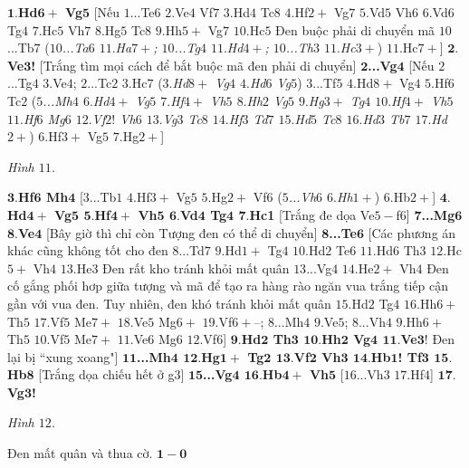 \begin{multicols}{2}
	\vskip 0.1cm
	$\pmb{1.}$\textbf{\color{gocco}Hd$\pmb{6+}$ Vg}$\pmb{5}$ [Nếu $1$...Te$6$ $2.$Ve$4$ Vf$7$ $3.$Hd$4$ Tc$8$ $4.$Hf$2+$ Vg$7$ $5.$Vd$5$ Vh$6$ $6.$Vd$6$ Tg$4$ $7.$Hc$5$ Vh$7$ $8.$Hg$5$ Tc$8$ $9.$Hh$5+$ Vg$7$ $10.$Hc$5$ 
	\vskip 0.1cm
	Đen buộc phải di chuyển mã $10$...Tb$7$ (\textit{$10$...Ta$6$ $11.$Ha$7+$; $10$...Tg$4$ $11.$Hd$4+$; $10$...Th$3$ $11.$Hc$3+$}) $11.$Hc$7+$]
	\vskip 0.1cm
	$\pmb{2.}$\textbf{\color{gocco}Ve$\pmb{3}$!} [Trắng tìm mọi cách để bắt buộc mã đen phải di chuyển]
	\vskip 0.1cm
	$\pmb{2}$\textbf{\color{gocco}...Vg}$\pmb{4}$ [Nếu $2$...Tg$4$ $3.$Ve$4$; $2$...Tc$2$ $3.$Hc$7$ ($3.$\textit{Hd$8+$ Vg$4$ $4.$Hd$6$ Vg$5$}) $3$...Tf$5$ $4.$Hd$8+$ Vg$4$ $5.$Hf$6$ Tc$2$ (\textit{$5$...Mh$4$ $6.$Hd$4+$ Vg$5$ $7.$Hf$4+$ Vh$5$ $8.$Hh$2$ Vg$5$ $9.$Hg$3+$ Tg$4$ $10.$Hf$4+$ Vh$5$ $11.$Hf$6$ Mg$6$ $12.$Vf$2!$ Vh$6$ $13.$Vg$3$ Tc$8$ $14.$Hf$3$ Td$7$ $15.$Hd$5$ Tc$8$ $16.$Hd$3$ Tb$7$ $17.$Hd$2+$}) $6.$Hf$3+$ Vg$5$ $7.$Hg$2+$]
	\begin{center}
		\newgame
		\showboard
		\vskip 0.1cm
		\textit{\small\color{gocco}Hình $11$.}
	\end{center}
	$\pmb{3.}$\textbf{\color{gocco}Hf$\pmb{6}$ Mh}$\pmb{4}$ [$3$...Tb$1$ $4.$Hf$3+$ Vg$5$ $5.$Hg$2+$ Vf$6$ (\textit{$5$...Vh$6$ $6.$Hh$1+$}) $6.$Hb$2+$]
	\vskip 0.1cm
	$\pmb{4.}$\textbf{\color{gocco}Hd$\pmb{4+}$ Vg$\pmb{5}$ $\pmb{5.}$Hf$\pmb{4+}$ Vh$\pmb{5}$ $\pmb{6.}$Vd$\pmb{4}$ Tg$\pmb{4}$ $\pmb{7.}$Hc1} [Trắng đe dọa Ve$5-$f$6$]
	\vskip 0.1cm
	$\pmb{7}$\textbf{\color{gocco}...Mg$\pmb{6}$ $\pmb{8.}$Ve}$\pmb{4}$ [Bây giờ thì chỉ còn Tượng đen có thể di chuyển]
	\vskip 0.1cm
	$\pmb{8}$\textbf{\color{gocco}...Te}$\pmb{6}$ [Các phương án khác cũng không tốt cho đen $8$...Td$7$ $9.$Hd$1+$ Tg$4$ $10.$Hd$2$ Te$6$ $11.$Hd$6$ Th$3$ $12.$Hc$5+$ Vh$4$ $13.$He$3$ Đen rất kho tránh khỏi mất quân $13$...Vg$4$ $14.$He$2+$ Vh$4$ Đen cố gắng phối hơp giữa tượng và mã để tạo ra hàng rào ngăn vua trắng tiếp cận gần với vua đen. Tuy nhiên, đen khó tránh khỏi mất quân $15.$Hd$2$ Tg$4$ $16.$Hh$6+$ Th$5$ $17.$Vf$5$ Me$7+$ $18.$Ve$5$ Mg$6+$ $19.$Vf$6+–$; $8$...Mh$4$ $9.$Ve$5$; $8$...Vh$4$ $9.$Hh$6+$ Th$5$ $10.$Vf$5$ Me$7+$ $11.$Ve$6$ Mg$6$ $12.$Vf$6$]
	\vskip 0.1cm
	$\pmb{9.}$\textbf{\color{gocco}Hd$\pmb{2}$ Th$\pmb{3}$ $\pmb{10.}$Hh$\pmb{2}$ Vg$\pmb{4}$ $\pmb{11.}$Ve$\pmb{3!}$} 
	Đen lại bị ``xung xoang"]
	\vskip 0.1cm
	$\pmb{11}$\textbf{\color{gocco}...Mh$\pmb{4}$ $\pmb{12.}$Hg$\pmb{1+}$ Tg$\pmb{2}$ $\pmb{13.}$Vf$\pmb{2}$ Vh$\pmb{3}$ $\pmb{14.}$Hb$\pmb{1}$! Tf$\pmb{3}$ $\pmb{15.}$Hb}$\pmb{8}$ [Trắng dọa chiếu hết ở g$3$]
	\vskip 0.1cm
	$\pmb{15}$\textbf{\color{gocco}...Vg$\pmb{4}$ $\pmb{16.}$Hb$\pmb{4+}$ Vh}$\pmb{5}$ [$16$...Vh$3$ $17.$Hf$4$]
	\vskip 0.1cm
	$\pmb{17.}$\textbf{\color{gocco}Vg$\pmb{3}$!}
	\begin{center}
		\newgame
		\showboard
		\vskip 0.1cm
		\textit{\small\color{gocco}Hình $12$.}
		\end{center}
	\vskip 0.1cm
	\columnbreak
	Đen mất quân và thua cờ.
	\vskip 0.1cm
	$\pmb{1-0}$
\end{multicols}